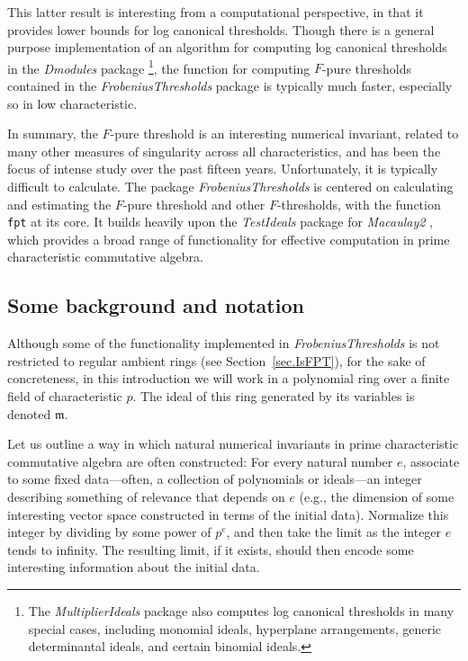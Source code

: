 \documentclass{amsart}
\newcommand{\idealm}{\mathfrak{m}}
\begin{document}
This latter result is interesting from a computational perspective, in that it provides lower bounds for log canonical thresholds.
Though there is a general purpose implementation of an algorithm for computing log canonical thresholds in the \emph{Dmodules} package \cite{DmodulesSource}\footnote{The \emph{MultiplierIdeals} package \cite{MultiplierIdealsPackage, MultiplierIdealsArticle} also computes log canonical thresholds in many special cases, including monomial ideals, hyperplane arrangements, generic determinantal ideals, and certain binomial ideals.
}, the function for computing $F$-pure thresholds contained in the \emph{FrobeniusThresholds} package is typically much faster, especially so in low characteristic.

In summary,  the $F$-pure threshold is an interesting numerical invariant, related to many other measures of singularity across all characteristics, and has been the focus of intense study over the past fifteen years.
Unfortunately, it is typically difficult to calculate.
The package \emph{FrobeniusThresholds} is centered on calculating and estimating the $F$-pure threshold and other $F$-thresholds, with the function \texttt{fpt} at its core.
It builds heavily upon the \emph{TestIdeals} package for \emph{Macaulay2} \cite{TestIdealsPackage, TestIdealsPaper}, which provides a broad range of functionality for effective computation in prime characteristic commutative algebra.

\subsection{Some background and notation}
Although some of the functionality implemented in \emph{FrobeniusThresholds} is not restricted to regular ambient rings (see Section~\ref{sec.IsFPT}), for the sake of concreteness, in this introduction  we will work in a polynomial ring over a finite field of  characteristic $p$.
The ideal of this ring generated by its variables is denoted $\idealm$.

Let us outline a way in which natural numerical invariants in prime characteristic commutative algebra are often constructed:  For every natural number $e$, associate to some fixed data---often, a collection of polynomials or ideals---an integer describing something of relevance that depends on $e$ (e.g., the dimension of some interesting vector space constructed in terms of the initial data).
Normalize this integer by dividing by some power of $p^e$, and then take the limit as the integer $e$ tends to infinity.
The resulting limit, if it exists, should then encode some interesting information about the initial data.
\end{document}
